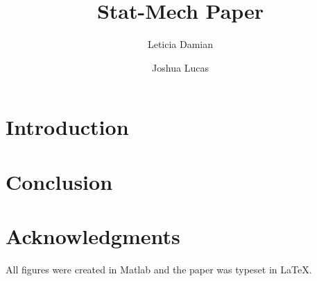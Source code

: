 \documentclass[prl,twocolumn]{revtex4-1}  %
\begin{document}

\title{ Stat-Mech Paper }
\author{Leticia Damian }
\author{Joshua Lucas}






\begin{abstract}

\end{abstract}
 

\maketitle %

\section{Introduction}

\lipsum






\clearpage
\section{Conclusion}
\lipsum
\appendix*   %


\section{ Acknowledgments}

 All figures were created in Matlab and the paper was typeset in \LaTeX.
\begin{acknowledgments}


\end{acknowledgments}
\end{document}
